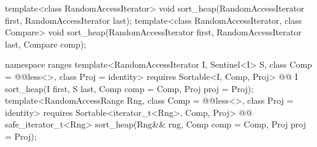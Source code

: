 \begin{codeblock}
  template<class RandomAccessIterator>
    void sort_heap(RandomAccessIterator first, RandomAccessIterator last);
  template<class RandomAccessIterator, class Compare>
    void sort_heap(RandomAccessIterator first, RandomAccessIterator last,
                   Compare comp);
\end{codeblock}\begin{addedblock}\begin{codeblock}
  namespace ranges {
    template<RandomAccessIterator I, Sentinel<I> S, class Comp = @@less<>,
        class Proj = identity>
      requires Sortable<I, Comp, Proj>
      @@ I
        sort_heap(I first, S last, Comp comp = Comp{}, Proj proj = Proj{});
    template<RandomAccessRange Rng, class Comp = @@less<>, class Proj = identity>
      requires Sortable<iterator_t<Rng>, Comp, Proj>
      @@ safe_iterator_t<Rng>
        sort_heap(Rng&& rng, Comp comp = Comp{}, Proj proj = Proj{});
  }
\end{codeblock}\end{addedblock}\begin{codeblock}


\end{codeblock}
